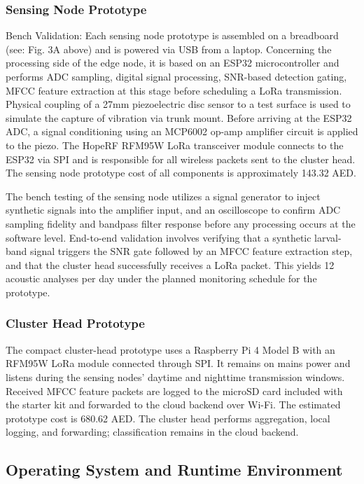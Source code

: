 \documentclass[12pt,a4paper,oneside]{memoir}
\begin{document}
\subsubsection{Sensing Node Prototype}

Bench Validation: Each sensing node prototype is assembled on a breadboard (see: Fig. 3A above) and is powered via USB from a laptop. Concerning the processing side of the edge node, it is based on an ESP32 microcontroller and performs ADC sampling, digital signal processing, SNR-based detection gating, MFCC feature extraction at this stage before scheduling a LoRa transmission. Physical coupling of a 27mm piezoelectric disc sensor to a test surface is used to simulate the capture of vibration via trunk mount. Before arriving at the ESP32 ADC, a signal conditioning using an MCP6002 op-amp amplifier circuit is applied to the piezo. The HopeRF RFM95W LoRa transceiver module connects to the ESP32 via SPI and is responsible for all wireless packets sent to the cluster head. The sensing node prototype cost of all components is approximately 143.32 AED.

The bench testing of the sensing node utilizes a signal generator to inject synthetic signals into the amplifier input, and an oscilloscope to confirm ADC sampling fidelity and bandpass filter response before any processing occurs at the software level. End-to-end validation involves verifying that a synthetic larval-band signal triggers the SNR gate followed by an MFCC feature extraction step, and that the cluster head successfully receives a LoRa packet. This yields 12 acoustic analyses per day under the planned monitoring schedule for the prototype.

\subsubsection{Cluster Head Prototype}

The compact cluster-head prototype uses a Raspberry Pi 4 Model B with an RFM95W LoRa module connected through SPI. It remains on mains power and listens during the sensing nodes' daytime and nighttime transmission windows. Received MFCC feature packets are logged to the microSD card included with the starter kit and forwarded to the cloud backend over Wi-Fi. The estimated prototype cost is 680.62 AED. The cluster head performs aggregation, local logging, and forwarding; classification remains in the cloud backend.

\subsection{Operating System and Runtime Environment}
\label{sec:os_runtime}
\end{document}
